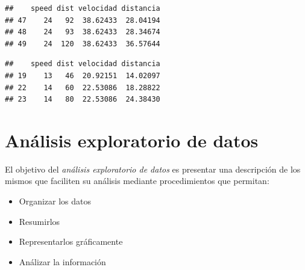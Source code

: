 \documentclass[]{book}
\newenvironment{Shaded}{\begin{snugshade}}{\end{snugshade}}
\newcommand{\DecValTok}[1]{\textcolor[rgb]{0.00,0.00,0.81}{#1}}
\newcommand{\StringTok}[1]{\textcolor[rgb]{0.31,0.60,0.02}{#1}}
\newcommand{\CommentTok}[1]{\textcolor[rgb]{0.56,0.35,0.01}{\textit{#1}}}
\newcommand{\OperatorTok}[1]{\textcolor[rgb]{0.81,0.36,0.00}{\textbf{#1}}}
\newcommand{\NormalTok}[1]{#1}
\providecommand{\tightlist}{%
  \setlength{\itemsep}{0pt}\setlength{\parskip}{0pt}}
\begin{document}
\begin{Shaded}
\end{Shaded}

\begin{verbatim}
##    speed dist velocidad distancia
## 47    24   92  38.62433  28.04194
## 48    24   93  38.62433  28.34674
## 49    24  120  38.62433  36.57644
\end{verbatim}

\begin{Shaded}
\end{Shaded}

\begin{verbatim}
##    speed dist velocidad distancia
## 19    13   46  20.92151  14.02097
## 22    14   60  22.53086  18.28822
## 23    14   80  22.53086  24.38430
\end{verbatim}

\chapter{Análisis exploratorio de
datos}\label{analisis-exploratorio-de-datos}

El objetivo del \emph{análisis exploratorio de datos} es presentar una
descripción de los mismos que faciliten su análisis mediante
procedimientos que permitan:

\begin{itemize}
\tightlist
\item
  Organizar los datos
\item
  Resumirlos
\item
  Representarlos gráficamente
\item
  Análizar la información
\end{itemize}
\end{document}
